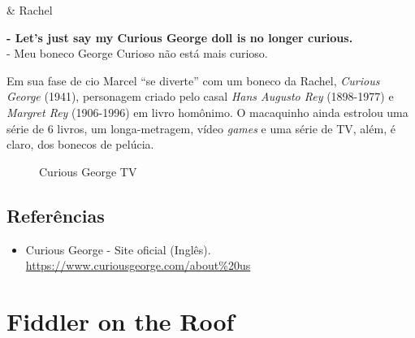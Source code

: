 \begin{tcolorbox}[enhanced,center upper,
    drop fuzzy shadow southeast, boxrule=0.3pt,
    lower separated=false, breakable,
    colframe=black!30!dialogoBorder,colback=white]
\medskip
\begin{minipage}[c]{0.16\linewidth}
   & \centering \scriptsize{Rachel}
\end{minipage}
\hfill
\begin{minipage}[c]{0.8\linewidth}
  \textbf{- Let's just say my Curious George doll is no longer curious.}\\
  - Meu boneco George Curioso não está mais curioso.
\end{minipage}
\end{tcolorbox}

Em sua fase de cio Marcel ``se diverte'' com um boneco da Rachel,
\emph{Curious George} (1941), personagem criado pelo casal \emph{Hans
Augusto Rey} (1898-1977) e \emph{Margret Rey} (1906-1996) em livro
homônimo. O macaquinho ainda estrolou uma série de 6 livros, um
longa-metragem, vídeo \emph{games} e uma série de TV, além, é claro, dos
bonecos de pelúcia.

\begin{figure}
  \centering
    \caption{Curious George TV\label{fig:curious-george-tv}}
\end{figure}

\hypertarget{referuxeancias}{%
\subsection{Referências}\label{referuxeancias}}

\begin{itemize}
\tightlist
\item
  \sloppy Curious George - Site oficial (Inglês). \url{https://www.curiousgeorge.com/about%20us}
\end{itemize}

\hypertarget{fiddler-on-the-roof}{%
\section{Fiddler on the Roof}\label{fiddler-on-the-roof}}

